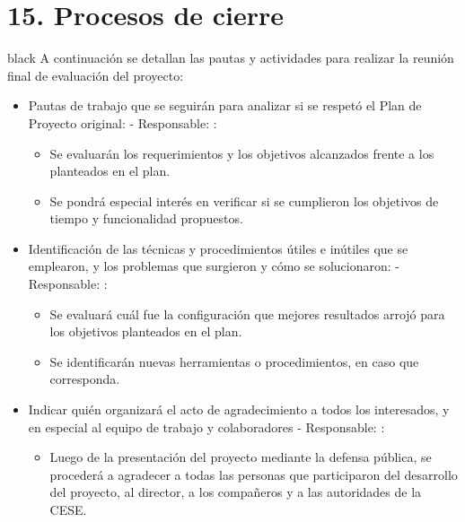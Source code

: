 \documentclass[
11pt, %
]{charter}
\begin{document}
\section{15. Procesos de cierre}   
\label{sec:cierre}

\begin{consigna}{black}
A continuación se detallan las pautas y actividades para realizar la reunión final de evaluación del proyecto:

\begin{itemize}
	\item Pautas de trabajo que se seguirán para analizar si se respetó el Plan de Proyecto original:
	 - Responsable: \authorname:
	\begin{itemize}			
		\item Se evaluarán los requerimientos y los objetivos alcanzados frente a los planteados en el plan.
		\item Se pondrá especial interés en verificar si se cumplieron los objetivos de tiempo y funcionalidad propuestos.
	\end{itemize}	    	 
	
	\item Identificación de las técnicas y procedimientos útiles e inútiles que se emplearon, y los problemas que surgieron y cómo se solucionaron:
	 - Responsable: \authorname:
	\begin{itemize}			
		\item Se evaluará cuál fue la configuración que mejores resultados arrojó para los objetivos planteados en el plan.
		\item Se identificarán nuevas herramientas o procedimientos, en caso que corresponda.
	\end{itemize}	    	 
	
	\item Indicar quién organizará el acto de agradecimiento a todos los interesados, y en especial al equipo de trabajo y colaboradores - Responsable: \authorname :
	\begin{itemize}			
		\item Luego de la presentación del proyecto mediante la defensa pública, se procederá a agradecer a todas las personas que participaron del desarrollo del proyecto, al director, a los compañeros y a las autoridades de la CESE.
	\end{itemize}	 
	
	    	 
	 
\end{itemize}

\end{consigna}
\end{document}
